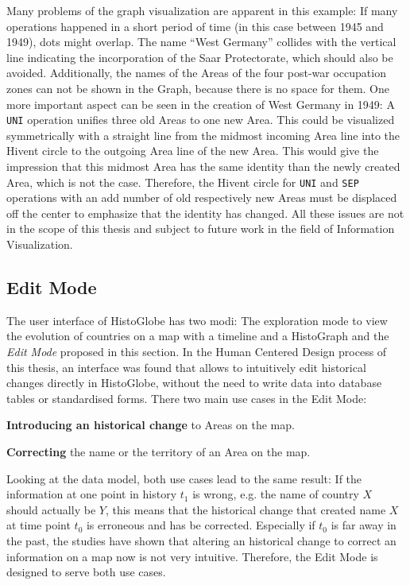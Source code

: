 Many problems of the graph visualization are apparent in this example: If many operations happened in a short period of time (in this case between 1945 and 1949), dots might overlap.
The name ``West Germany'' collides with the vertical line indicating the incorporation of the Saar Protectorate, which should also be avoided.
Additionally, the names of the Areas of the four post-war occupation zones can not be shown in the Graph, because there is no space for them.
One more important aspect can be seen in the creation of West Germany in 1949: A \texttt{UNI} operation unifies three old Areas to one new Area. This could be visualized symmetrically with a straight line from the midmost incoming Area line into the Hivent circle to the outgoing Area line of the new Area. This would give the impression that this midmost Area has the same identity than the newly created Area, which is not the case. Therefore, the Hivent circle for \texttt{UNI} and \texttt{SEP} operations with an add number of old respectively new Areas must be displaced off the center to emphasize that the identity has changed.
All these issues are not in the scope of this thesis and subject to future work in the field of Information Visualization.


\subsection{Edit Mode} %
\label{sub:edit_mode}

The user interface of HistoGlobe has two modi: The exploration mode to view the evolution of countries on a map with a timeline and a HistoGraph and the \emph{Edit Mode} proposed in this section. In the Human Centered Design process of this thesis, an interface was found that allows to intuitively edit historical changes directly in HistoGlobe, without the need to write data into database tables or standardised forms. There two main use cases in the Edit Mode:

\begin{compactenum}
  \item \textbf{Introducing an historical change} to Areas on the map.
  \item \textbf{Correcting} the name or the territory of an Area on the map.
\end{compactenum}

Looking at the data model, both use cases lead to the same result: If the information at one point in history $t_1$ is wrong, e.g. the name of country $X$ should actually be $Y$, this means that the historical change that created name $X$ at time point $t_0$ is erroneous and has be corrected. Especially if $t_0$ is far away in the past, the studies have shown that altering an historical change to correct an information on a map now is not very intuitive. Therefore, the Edit Mode is designed to serve both use cases.

